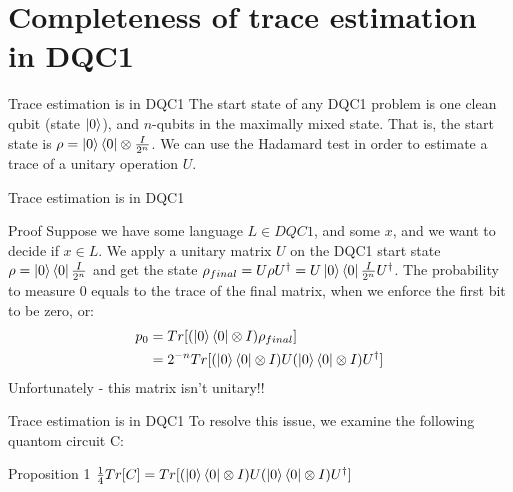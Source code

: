 \documentclass[leqno,fleqn]{beamer}
\begin{document}
\section{Completeness of trace estimation in DQC1}
\label{sec-2}
\begin{frame}[label=sec-2-1]{Trace estimation is in DQC1}
The start state of any DQC1 problem is one clean qubit (state \(\ket{0}\)), and \(n\)-qubits in the maximally mixed state. That is, the start state is \(\rho = \ket{0}\bra{0} \otimes \frac{I}{2^n}\). We can use the Hadamard test in order to estimate a trace of a unitary operation \(U\).
\end{frame}
\begin{frame}[label=sec-2-2]{Trace estimation is in DQC1}
\begin{block}{Proof}
Suppose we have some language \(L \in DQC1\), and some \(x\), and we want to decide if \(x \in L\). We apply a unitary matrix \(U\) on the DQC1 start state \(\rho=\ket{0}\bra{0}\frac{I}{2^n}\) and get the state \(\rho_{final} = U \rho U^\dagger = U\ket{0}\bra{0}\frac{I}{2^n}U^\dagger\).
The probability to measure 0 equals to the trace of the final matrix, when we enforce the first bit to be zero, or:
\begin{align*}
 p_{0} &= Tr[(\ket{0}\bra{0}\otimes I)\rho_{final}] \\
     &= 2^{-n}Tr[(\ket{0}\bra{0} \otimes I)U(\ket{0} \bra{0} \otimes I)U^\dagger]
\end{align*}
Unfortunately - this matrix isn't unitary!!
\end{block}
\end{frame}
\begin{frame}[label=sec-2-3]{Trace estimation is in DQC1}
To resolve this issue, we examine the following quantom circuit C:

\begin{block}{Proposition 1}
\(\frac{1}{4}Tr[C]=Tr[(\ket{0}\bra{0}\otimes I)U(\ket{0}\bra{0}\otimes I)U^\dagger]\)
\end{block}
\end{frame}
\end{document}
